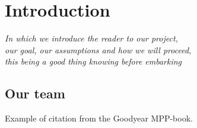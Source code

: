 \chapter{Introduction}\label{ch:intro}

\begin{flushright}{\slshape
    In which we introduce the reader to our project,\\
    our goal, our assumptions and how we will proceed,\\
    this being a good thing knowing before embarking
}
\end{flushright}




\section{Our team}




Example of citation from the Goodyear MPP-book\cite{potter1985mpp}.
